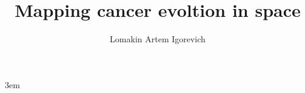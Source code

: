 \documentclass[english, twoside, titlepage, DIV=8, BCOR=8.5mm, open=right, chapterprefix=false]{scrbook}
\title{Mapping cancer evoltion in space}
\author{Lomakin Artem Igorevich}
\begin{document}
\emergencystretch 3em %

\maketitle
\frontmatter
\tableofcontents
\listoffigs
\listofabbrev

\mainmatter








\appendix
\listofreferences
\end{document}
